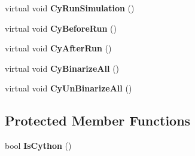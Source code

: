 \begin{DoxyCompactItemize}
\item 
\hypertarget{classelps_1_1_lab_simulator_base_adb07b83ae21fe4588c01fb2ea5aaa427}{virtual void {\bfseries Cy\+Run\+Simulation} ()}\label{classelps_1_1_lab_simulator_base_adb07b83ae21fe4588c01fb2ea5aaa427}

\item 
\hypertarget{classelps_1_1_lab_simulator_base_a204fa57c239566bc7e9d02012d5c31b0}{virtual void {\bfseries Cy\+Before\+Run} ()}\label{classelps_1_1_lab_simulator_base_a204fa57c239566bc7e9d02012d5c31b0}

\item 
\hypertarget{classelps_1_1_lab_simulator_base_ab6fddd9f0103046106386e06652cbdb4}{virtual void {\bfseries Cy\+After\+Run} ()}\label{classelps_1_1_lab_simulator_base_ab6fddd9f0103046106386e06652cbdb4}

\item 
\hypertarget{classelps_1_1_lab_simulator_base_a77ad86420075a60545bc258255742a5b}{virtual void {\bfseries Cy\+Binarize\+All} ()}\label{classelps_1_1_lab_simulator_base_a77ad86420075a60545bc258255742a5b}

\item 
\hypertarget{classelps_1_1_lab_simulator_base_a5222d1d5b2489bfcc050870b054f27e1}{virtual void {\bfseries Cy\+Un\+Binarize\+All} ()}\label{classelps_1_1_lab_simulator_base_a5222d1d5b2489bfcc050870b054f27e1}

\end{DoxyCompactItemize}
\subsection*{Protected Member Functions}
\begin{DoxyCompactItemize}
\item 
\hypertarget{classelps_1_1_lab_simulator_base_a32b9f5723c7c9cf33e4fc3073ea52140}{bool {\bfseries Is\+Cython} ()}\label{classelps_1_1_lab_simulator_base_a32b9f5723c7c9cf33e4fc3073ea52140}

\end{DoxyCompactItemize}
